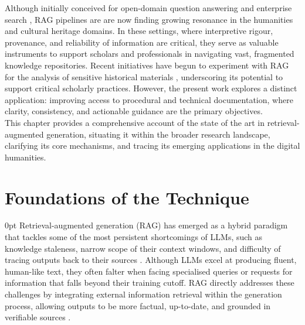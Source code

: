 \begin{spacing}{1.5}
Although initially conceived for open-domain question answering and enterprise search \parencite{akkiraju_facts_2024, jiang_towards_2024, packowski_optimizing_2024, yang_ragva_2025, zhou_enabling_2025}, RAG pipelines are are now finding growing resonance in the humanities and cultural heritage domains. In these settings, where interpretive rigour, provenance, and reliability of information are critical, they serve as valuable instruments to support scholars and professionals in navigating vast, fragmented knowledge repositories. Recent initiatives have begun to experiment with RAG for the analysis of sensitive historical materials \citep{callaghan_prototyping_2025, ciletti_retrieval-augmented_2025, sergeev_talking_2025, fan_research_2025}, underscoring its potential to support critical scholarly practices. However, the present work explores a distinct application: improving access to procedural and technical documentation, where clarity, consistency, and actionable guidance are the primary objectives.
\\

This chapter provides a comprehensive account of the state of the art in retrieval-augmented generation, situating it within the broader research landscape, clarifying its core mechanisms, and tracing its emerging applications in the digital humanities.

\section{Foundations of the Technique}\setlength{\parskip}
{0pt}
Retrieval-augmented generation (RAG) has emerged as a hybrid paradigm that tackles some of the most persistent shortcomings of LLMs, such as knowledge staleness, narrow scope of their context windows, and difficulty of tracing outputs back to their sources \citep{vaibhav_retrieval-augmented_2025,gao_retrieval-augmented_2024, gupta_comprehensive_2024}. Although LLMs excel at producing fluent, human-like text, they often falter when facing specialised queries or requests for information that falls beyond their training cutoff. RAG directly addresses these challenges by integrating external information retrieval within the generation process, allowing outputs to be more factual, up-to-date, and grounded in verifiable sources \citep{wang_searching_2024}.


\end{spacing}
